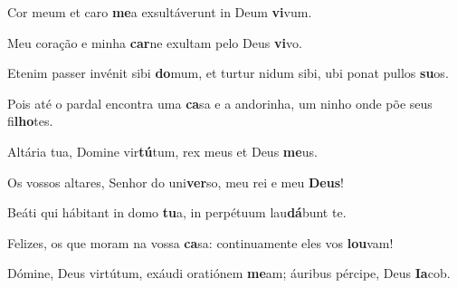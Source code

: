 \begin{greenumerate}
  \setcounter{enumi}{1}


  \item Cor meum et caro \textbf{me}a {\GreStar} exsultáverunt in Deum \textbf{vi}\-vum. 

  \switchcolumn%
  \setcounter{enumi}{1}

  \item Meu coração e minha \textbf{car}ne {\GreStar} exultam pelo Deus \textbf{vi}vo. 

  \switchcolumn*


  \item Etenim passer invénit sibi \textbf{do}mum, {\GreStar} et turtur nidum sibi, ubi ponat pullos \textbf{su}os. 
  \switchcolumn%

  \item Pois até o pardal encontra uma \textbf{ca}sa {\GreStar} e a andorinha, um ninho onde põe seus fi\textbf{lho}tes. 

  \switchcolumn*


  \item Altária tua, Domine vir\textbf{tú}tum, {\GreStar} rex meus et Deus \textbf{me}us. 
  \switchcolumn%

  \item Os vossos altares, Senhor do uni\textbf{ver}so, {\GreStar} meu rei e meu \textbf{Deus}! 

  \switchcolumn*


  \item Beáti qui hábitant in domo \textbf{tu}a, {\GreStar} in perpétuum lau\-\textbf{dá}\-bunt te. 
  \switchcolumn%

  \item Felizes, os que moram na vossa \textbf{ca}sa: {\GreStar} continuamente eles vos \textbf{lou}vam! 

  \switchcolumn*


  \item Dómine, Deus virtútum, exáudi oratiónem \textbf{me}am; {\GreStar} áuribus pércipe, Deus \textbf{Ia}cob. 
  \switchcolumn%


\end{greenumerate}
